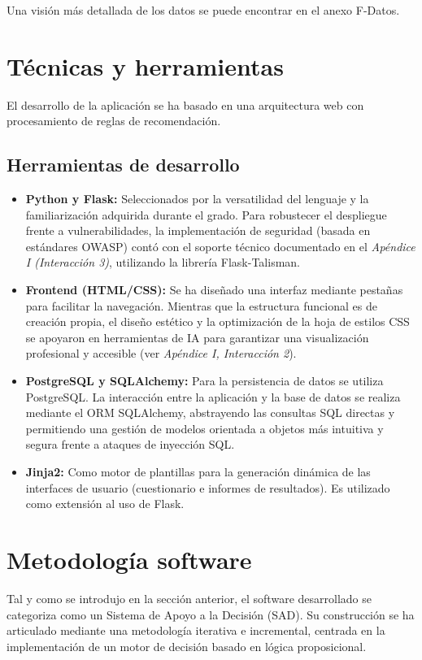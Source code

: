 Una visión más detallada de los datos se puede encontrar en el anexo F-Datos.

\section{Técnicas y herramientas}
El desarrollo de la aplicación se ha basado en una arquitectura web con procesamiento de reglas de recomendación.

\subsection{Herramientas de desarrollo}
\begin{itemize}
    	\item \textbf{Python y Flask:} Seleccionados por la versatilidad del lenguaje y la familiarización adquirida durante el grado. Para robustecer el despliegue frente a vulnerabilidades, la implementación de seguridad (basada en estándares OWASP) contó con el soporte técnico 				documentado en el \textit{Apéndice I (Interacción 3)}, utilizando la librería Flask-Talisman.
    	\item \textbf{Frontend (HTML/CSS):} Se ha diseñado una interfaz mediante pestañas para facilitar la navegación. Mientras que la estructura funcional es de creación propia, el diseño estético y la optimización de la hoja de estilos CSS se apoyaron en herramientas de IA para 				garantizar una visualización profesional y accesible (ver \textit{Apéndice I, Interacción 2}).
    	\item \textbf{PostgreSQL y SQLAlchemy:} Para la persistencia de datos se utiliza PostgreSQL. La interacción entre la aplicación y la base de datos se realiza mediante el ORM SQLAlchemy, abstrayendo las consultas SQL directas y permitiendo una gestión de modelos orientada a 			objetos más intuitiva y segura frente a ataques de inyección SQL.
    	\item \textbf{Jinja2:} Como motor de plantillas para la generación dinámica de las interfaces de usuario (cuestionario e informes de resultados). Es utilizado como extensión al uso de Flask.
\end{itemize}

\section{Metodología software}
Tal y como se introdujo en la sección anterior, el software desarrollado se categoriza como un Sistema de Apoyo a la Decisión (SAD). Su construcción se ha articulado mediante una metodología iterativa e incremental, centrada en la implementación de un motor de decisión basado en lógica proposicional.

